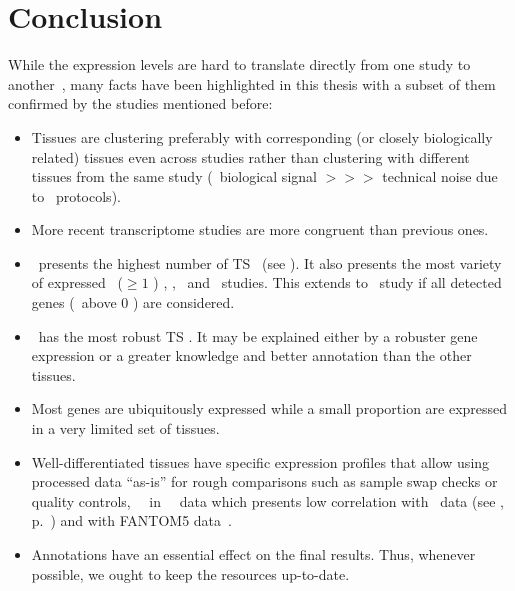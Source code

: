 \vspace{4mm}
\section{Conclusion}
While the expression levels are hard to translate directly from one study
to another~,
many facts have been highlighted in this thesis with a subset of them confirmed
by the studies mentioned before:%
\clearpage
\begin{itemize}[nosep,topsep=0pt]
        \item Tissues are clustering preferably with corresponding
            (or closely biologically related) tissues even across studies
            rather than clustering with different tissues from the same study
            (\ie\ biological signal $>>>$ technical noise due to \Rnaseq\ protocols).
        \item More recent transcriptome studies are more congruent than previous ones.
        \item \testis\ presents the highest number of \gls{TS} \pcgs\
            (see ).
            It also presents the most variety of expressed \pcgs\ ($≥1$ \FPKM)
            \castle, \brawand, \ibm\ and \uhlen\ studies.
            This extends to \gtex\ study if all detected genes (\ie\ above 0 \FPKM)
            are considered.
        \item \liver\ has the most robust \gls{TS} \pcgs.
            It may be explained either by a robuster gene expression
            or a greater knowledge and better annotation
            than the other tissues.
        \item Most genes are ubiquitously expressed while
          a small proportion are expressed in a very limited set of tissues.
        \item Well-differentiated tissues have specific expression profiles
            that allow using processed data \enquote{as-is} for rough comparisons
            such as sample swap checks
            or quality controls, \eg\ \salivary\ in \uhlen\ \etal\ data which
            presents low correlation with
            \gtex\ data (see ,
            p.~\pageref{fig:SamedistribPearsCorr}) and with
            FANTOM5 data~.
        \item Annotations have an essential effect on the final results.
              Thus, whenever possible, we ought to keep the resources up-to-date.
\end{itemize}

